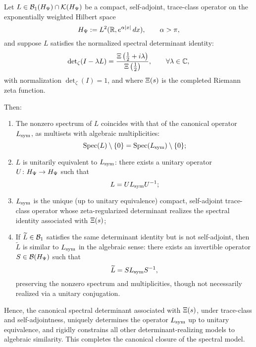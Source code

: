 \begin{lemma}
\label{lem:canonical_closure}

Let \( L \in \mathcal{B}_1(H_{\Psi}) \cap \mathcal{K}(H_{\Psi}) \) be a compact, self-adjoint, trace-class operator on the exponentially weighted Hilbert space
\[
H_{\Psi} := L^2(\mathbb{R}, e^{\alpha |x|} \, dx), \qquad \alpha > \pi,
\]
and suppose \( L \) satisfies the normalized spectral determinant identity:
\[
\det\nolimits_\zeta(I - \lambda L) = \frac{\Xi\left(\tfrac{1}{2} + i\lambda\right)}{\Xi\left(\tfrac{1}{2}\right)}, \qquad \forall \lambda \in \mathbb{C},
\]
with normalization \( \det\nolimits_\zeta(I) = 1 \), and where \( \Xi(s) \) is the completed Riemann zeta function.

\medskip
\noindent
Then:
\begin{enumerate}
  \item The nonzero spectrum of \( L \) coincides with that of the canonical operator \( L_{\mathrm{sym}} \), as multisets with algebraic multiplicities:
  \[
  \operatorname{Spec}(L) \setminus \{0\} = \operatorname{Spec}(L_{\mathrm{sym}}) \setminus \{0\};
  \]
  
  \item \( L \) is unitarily equivalent to \( L_{\mathrm{sym}} \): there exists a unitary operator \( U \colon H_{\Psi} \to H_{\Psi} \) such that
  \[
  L = U L_{\mathrm{sym}} U^{-1};
  \]
  
  \item \( L_{\mathrm{sym}} \) is the unique (up to unitary equivalence) compact, self-adjoint trace-class operator whose zeta-regularized determinant realizes the spectral identity associated with \( \Xi(s) \);
  
  \item If \( \widetilde{L} \in \mathcal{B}_1 \) satisfies the same determinant identity but is not self-adjoint, then \( \widetilde{L} \) is similar to \( L_{\mathrm{sym}} \) in the algebraic sense: there exists an invertible operator \( S \in \mathcal{B}(H_{\Psi}) \) such that
  \[
  \widetilde{L} = S L_{\mathrm{sym}} S^{-1},
  \]
  preserving the nonzero spectrum and multiplicities, though not necessarily realized via a unitary conjugation.
\end{enumerate}

\medskip
\noindent
Hence, the canonical spectral determinant associated with \( \Xi(s) \), under trace-class and self-adjointness, uniquely determines the operator \( L_{\mathrm{sym}} \) up to unitary equivalence, and rigidly constrains all other determinant-realizing models to algebraic similarity. This completes the canonical closure of the spectral model.
\end{lemma}
